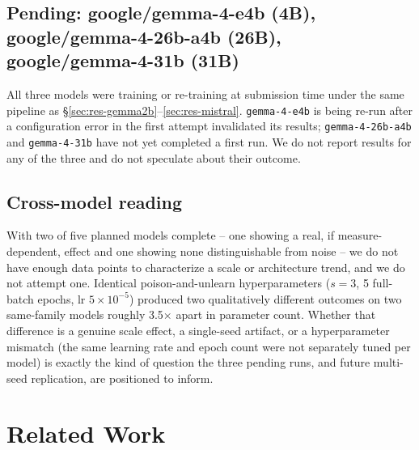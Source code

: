 \documentclass[runningheads]{llncs}
\begin{document}
\subsection{Pending: google/gemma-4-e4b (4B), google/gemma-4-26b-a4b (26B), google/gemma-4-31b (31B)}
\label{sec:results-pending}
All three models were training or re-training at submission time under the same pipeline as \S\ref{sec:res-gemma2b}--\ref{sec:res-mistral}. \texttt{gemma-4-e4b} is being re-run after a configuration error in the first attempt invalidated its results; \texttt{gemma-4-26b-a4b} and \texttt{gemma-4-31b} have not yet completed a first run. We do not report results for any of the three and do not speculate about their outcome.

\subsection{Cross-model reading}
With two of five planned models complete -- one showing a real, if measure-dependent, effect and one showing none distinguishable from noise -- we do not have enough data points to characterize a scale or architecture trend, and we do not attempt one. Identical poison-and-unlearn hyperparameters ($s{=}3$, 5 full-batch epochs, lr $5\times10^{-5}$) produced two qualitatively different outcomes on two same-family models roughly 3.5$\times$ apart in parameter count. Whether that difference is a genuine scale effect, a single-seed artifact, or a hyperparameter mismatch (the same learning rate and epoch count were not separately tuned per model) is exactly the kind of question the three pending runs, and future multi-seed replication, are positioned to inform.

\section{Related Work}
\end{document}
